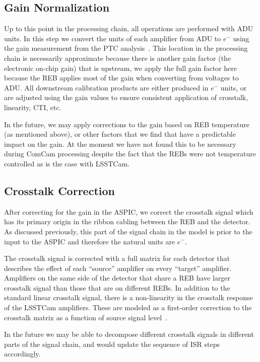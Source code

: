 \documentclass[SE,authoryear,lsstdraft,toc]{lsstdoc}
\newcommand{\etron}{e^{-}}
\begin{document}
\subsection{Gain Normalization}
\label{sec:gainnorm}

Up to this point in the processing chain, all operations are performed with ADU units.
In this step we convert the units of each amplifier from ADU to $\etron$ using the gain measurement from the PTC analysis~\citep{2019A&A...629A..36A}.
This location in the processing chain is necessarily approximate because there is another gain factor (the electronic on-chip gain) that is upstream, we apply the full gain factor here because the REB applies most of the gain when converting from voltages to ADU.
All downstream calibration products are either produced in $\etron$ units, or are adjusted using the gain values to ensure consistent application of crosstalk, linearity, CTI, etc.

In the future, we may apply corrections to the gain based on REB temperature (as mentioned above), or other factors that we find that have a predictable impact on the gain.
At the moment we have not found this to be necessary during ComCam processing despite the fact that the REBs were not temperature controlled as is the case with LSSTCam.

\subsection{Crosstalk Correction}
\label{sec:xtalkcorr}

After correcting for the gain in the ASPIC, we correct the crosstalk signal which has its primary origin in the ribbon cabling between the REB and the detector.
As discussed previously, this part of the signal chain in the model is prior to the input to the ASPIC and therefore the natural units are $\etron$.

The crosstalk signal is corrected with a full matrix for each detector that describes the effect of each ``source'' amplifier on every ``target'' amplifier.
Amplifiers on the same side of the detector that share a REB have larger crosstalk signal than those that are on different REBs.
In addition to the standard linear crosstalk signal, there is a non-linearity in the crosstalk response of the LSSTCam amplifiers.
These are modeled as a first-order correction to the crosstalk matrix as a function of source signal level~\citep{2020PhDT........49S}.

In the future we may be able to decompose different crosstalk signals in different parts of the signal chain, and would update the sequence of ISR steps accordingly.
\end{document}
